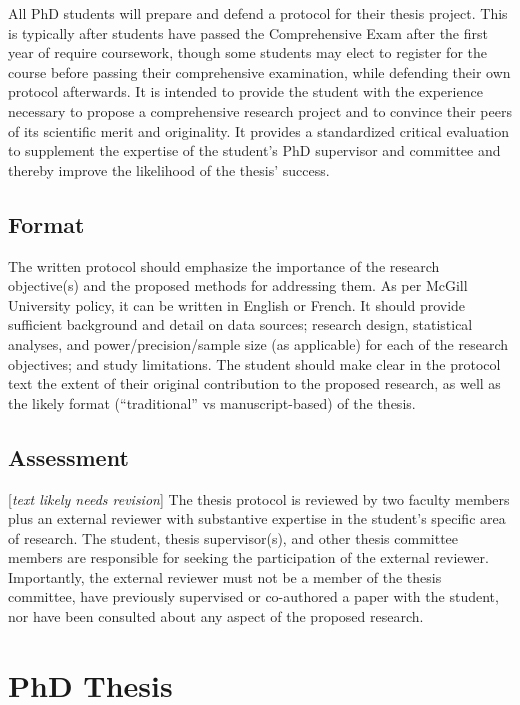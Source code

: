 \documentclass[
  openany]{book}
\begin{document}
All PhD students will prepare and defend a protocol for their thesis project. This is typically after students have passed the Comprehensive Exam after the first year of require coursework, though some students may elect to register for the course before passing their comprehensive examination, while defending their own protocol afterwards. It is intended to provide the student with the experience necessary to propose a comprehensive research project and to convince their peers of its scientific merit and originality. It provides a standardized critical evaluation
to supplement the expertise of the student's PhD supervisor and committee and thereby improve the likelihood of the thesis' success.

\hypertarget{format}{%
\section{Format}\label{format}}

The written protocol should emphasize the importance of the research objective(s) and the proposed methods for addressing them. As per McGill University policy, it can be written in English or French. It should provide sufficient background and detail on data sources; research design, statistical analyses, and power/precision/sample size (as applicable) for each of the research objectives; and study limitations. The student should make clear in the protocol text the extent of their original contribution to the proposed research, as well as the likely format (``traditional'' vs manuscript-based) of the thesis.

\hypertarget{assessment}{%
\section{Assessment}\label{assessment}}

{[}\emph{text likely needs revision}{]}
The thesis protocol is reviewed by two faculty members plus an external reviewer with substantive expertise in the student's specific area of research. The student, thesis supervisor(s), and other thesis committee members are responsible for seeking the participation of the external reviewer. Importantly, the external reviewer must not be a member of the thesis committee, have previously supervised or co-authored a paper with the student, nor have been consulted about any aspect of the proposed research.

\hypertarget{phd-thesis}{%
\chapter{PhD Thesis}\label{phd-thesis}}
\end{document}
